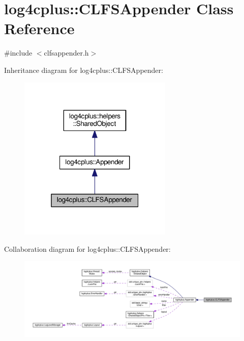 \hypertarget{classlog4cplus_1_1CLFSAppender}{\section{log4cplus\-:\-:C\-L\-F\-S\-Appender Class Reference}
\label{classlog4cplus_1_1CLFSAppender}
}


{\ttfamily \#include $<$clfsappender.\-h$>$}



Inheritance diagram for log4cplus\-:\-:C\-L\-F\-S\-Appender\-:
\nopagebreak
\begin{figure}[H]
\begin{center}
\leavevmode
\includegraphics[width=208pt]{classlog4cplus_1_1CLFSAppender__inherit__graph}
\end{center}
\end{figure}


Collaboration diagram for log4cplus\-:\-:C\-L\-F\-S\-Appender\-:
\nopagebreak
\begin{figure}[H]
\begin{center}
\leavevmode
\includegraphics[width=350pt]{classlog4cplus_1_1CLFSAppender__coll__graph}
\end{center}
\end{figure}
